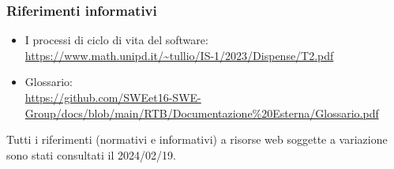         \subsubsection{Riferimenti informativi}

        \begin{itemize}
            \item I processi di ciclo di vita del software: \\
            \url{https://www.math.unipd.it/~tullio/IS-1/2023/Dispense/T2.pdf}
            \item Glossario: \\
            \url{https://github.com/SWEet16-SWE-Group/docs/blob/main/RTB/Documentazione%20Esterna/Glossario.pdf}
        \end{itemize}

        Tutti i riferimenti (normativi e informativi) a risorse web soggette a variazione sono stati consultati il 2024/02/19.
